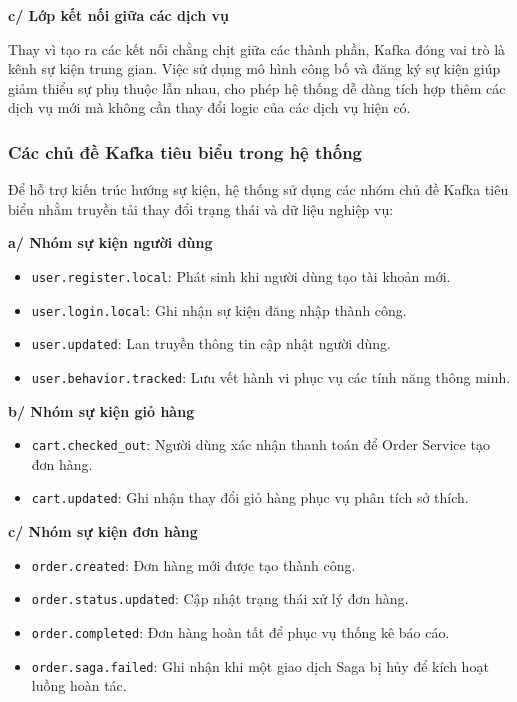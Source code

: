\textbf{c/ Lớp kết nối giữa các dịch vụ}

Thay vì tạo ra các kết nối chằng chịt giữa các thành phần, Kafka đóng vai trò là kênh sự kiện trung gian. Việc sử dụng mô hình công bố và đăng ký sự kiện giúp giảm thiểu sự phụ thuộc lẫn nhau, cho phép hệ thống dễ dàng tích hợp thêm các dịch vụ mới mà không cần thay đổi logic của các dịch vụ hiện có.

\subsubsection{Các chủ đề Kafka tiêu biểu trong hệ thống}

Để hỗ trợ kiến trúc hướng sự kiện, hệ thống sử dụng các nhóm chủ đề Kafka tiêu biểu nhằm truyền tải thay đổi trạng thái và dữ liệu nghiệp vụ:

\textbf{a/ Nhóm sự kiện người dùng}
\begin{itemize}
    \item \texttt{user.register.local}: Phát sinh khi người dùng tạo tài khoản mới.
    \item \texttt{user.login.local}: Ghi nhận sự kiện đăng nhập thành công.
    \item \texttt{user.updated}: Lan truyền thông tin cập nhật người dùng.
    \item \texttt{user.behavior.tracked}: Lưu vết hành vi phục vụ các tính năng thông minh.
\end{itemize}

\textbf{b/ Nhóm sự kiện giỏ hàng}
\begin{itemize}
    \item \texttt{cart.checked\_out}: Người dùng xác nhận thanh toán để Order Service tạo đơn hàng.
    \item \texttt{cart.updated}: Ghi nhận thay đổi giỏ hàng phục vụ phân tích sở thích.
\end{itemize}

\textbf{c/ Nhóm sự kiện đơn hàng}
\begin{itemize}
    \item \texttt{order.created}: Đơn hàng mới được tạo thành công.
    \item \texttt{order.status.updated}: Cập nhật trạng thái xử lý đơn hàng.
    \item \texttt{order.completed}: Đơn hàng hoàn tất để phục vụ thống kê báo cáo.
    \item \texttt{order.saga.failed}: Ghi nhận khi một giao dịch Saga bị hủy để kích hoạt luồng hoàn tác.
\end{itemize}

